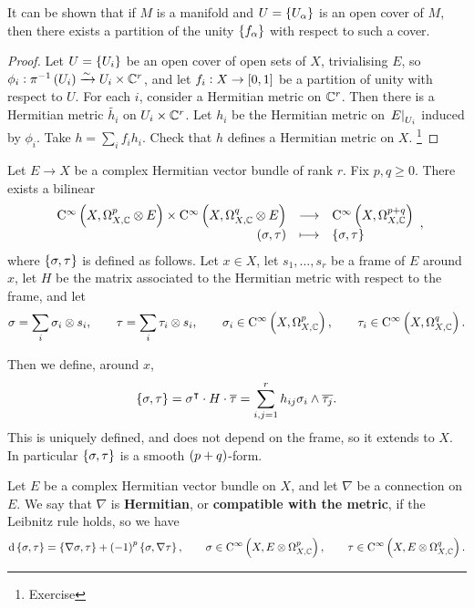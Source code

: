 It can be shown that if $ M $ is a manifold and $ U = \cbr{U_\alpha} $ is an open cover of $ M $, then there exists a partition of the unity $ \cbr{f_\alpha} $ with respect to such a cover.

\begin{proof}
Let $ U = \cbr{U_i} $ be an open cover of open sets of $ X $, trivialising $ E $, so $ \phi_i : \pi^{-1}\br{U_i} \xrightarrow{\sim} U_i \times \CC^r $, and let $ f_i : X \to \sbr{0, 1} $ be a partition of unity with respect to $ U $. For each $ i $, consider a Hermitian metric on $ \mathbb{C}^r $. Then there is a Hermitian metric $ \widetilde{h_i} $ on $ U_i \times \mathbb{C}^r $. Let $ h_i $ be the Hermitian metric on $ \left. E \right|_{U_i} $ induced by $ \phi_i $. Take $ h = \sum_i f_ih_i $. Check that $ h $ defines a Hermitian metric on $ X $. \footnote{Exercise}
\end{proof}


Let $ E \to X $ be a complex Hermitian vector bundle of rank $ r $. Fix $ p, q \ge 0 $. There exists a bilinear
$$ \function{\C^\infty\br{X, \Omega_{X, \CC}^p \otimes E} \times \C^\infty\br{X, \Omega_{X, \CC}^q \otimes E}}{\C^\infty\br{X, \Omega_{X, \CC}^{p + q}}}{\br{\sigma, \tau}}{\cbr{\sigma, \tau}}, $$
where $ \cbr{\sigma, \tau} $ is defined as follows. Let $ x \in X $, let $ s_1, \dots, s_r $ be a frame of $ E $ around $ x $, let $ H $ be the matrix associated to the Hermitian metric with respect to the frame, and let
$$ \sigma = \sum_i \sigma_i \otimes s_i, \qquad \tau = \sum_i \tau_i \otimes s_i, \qquad \sigma_i \in \C^\infty\br{X, \Omega_{X, \CC}^p}, \qquad \tau_i \in \C^\infty\br{X, \Omega_{X, \CC}^q}. $$

\pagebreak

Then we define, around $ x $,
$$ \cbr{\sigma, \tau} = \sigma^\intercal \cdot H \cdot \overline{\tau} = \sum_{i, j = 1}^r h_{ij}\sigma_i \wedge \overline{\tau_j}. $$
This is uniquely defined, and does not depend on the frame, so it extends to $ X $. In particular $ \cbr{\sigma, \tau} $ is a smooth $ \br{p + q} $-form.

\begin{definition}
Let $ E $ be a complex Hermitian vector bundle on $ X $, and let $ \nabla $ be a connection on $ E $. We say that $ \nabla $ is \textbf{Hermitian}, or \textbf{compatible with the metric}, if the Leibnitz rule holds, so we have
$$ \d\cbr{\sigma, \tau} = \cbr{\nabla\sigma, \tau} + \br{-1}^p\cbr{\sigma, \nabla\tau}, \qquad \sigma \in \C^\infty\br{X, E \otimes \Omega_{X, \CC}^p}, \qquad \tau \in \C^\infty\br{X, E \otimes \Omega_{X, \CC}^q}. $$
\end{definition}

